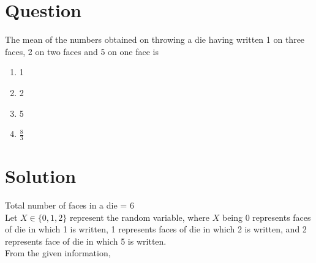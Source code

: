 \documentclass[journal,12pt,twocolumn]{IEEEtran}
\begin{document}
\section*{Question}
The mean of the numbers obtained on throwing
a die having written 1 on three faces, 2 on
two faces and 5 on one face is
\begin{enumerate}[label=\Alph*)]
    \item 1
    \item 2
    \item 5
    \item $\frac{8}{3}$
\end{enumerate}
\section*{Solution}
Total number of faces in a die = 6
\\Let $X \in \{0,1,2\}$ represent the random variable, where $X$ being 0 represents faces of die in which 1 is written, 1 represents faces of die in which 2 is written, and 2 represents face of die in which 5 is written. \\From the given information, 
\end{document}
